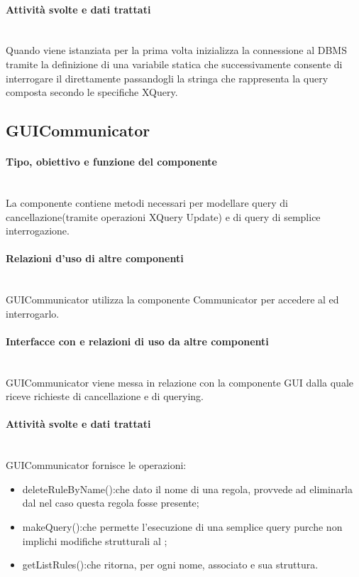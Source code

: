 \documentclass[11pt,titlepage,a4paper]{report}
\begin{document}
\paragraph{Attivit\`a svolte e dati trattati}\\
Quando viene istanziata per la prima volta inizializza la connessione al DBMS tramite la definizione di una variabile statica che successivamente consente di interrogare il \re direttamente passandogli la stringa che rappresenta la query composta secondo le specifiche XQuery.
%
\subsection{GUICommunicator}
\paragraph{Tipo, obiettivo e funzione del componente}\\
La componente contiene metodi necessari per modellare query di cancellazione(tramite operazioni XQuery Update) e di query di semplice interrogazione.
\paragraph{Relazioni d'uso di altre componenti}\\
GUICommunicator utilizza la componente Communicator per accedere al \re ed interrogarlo.
\paragraph{Interfacce con e relazioni di uso da altre componenti}\\
GUICommunicator viene messa in relazione con la componente GUI dalla quale riceve richieste di cancellazione e di querying.%
\paragraph{Attivit\`a svolte e dati trattati}\\
GUICommunicator fornisce le operazioni:
\begin{itemize}
 \item deleteRuleByName():che dato il nome di una regola, provvede ad eliminarla dal \re nel caso questa regola fosse presente;
 \item makeQuery():che permette l'esecuzione di una semplice query purche non implichi modifiche strutturali al \re;
 \item getListRules():che ritorna, per ogni \br nome, \bo associato e sua struttura.
\end{itemize}
\end{document}
